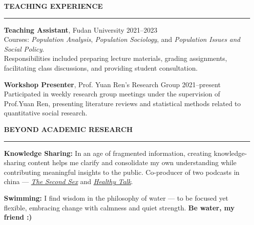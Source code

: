 \documentclass{resume} %
\renewenvironment{rSection}[1]{
\sectionskip
\textcolor{CarnegieMellonRed}{\MakeUppercase{#1}} %
\sectionlineskip
\hrule %
\begin{list}{}{
\setlength{\leftmargin}{1.5em} %
}
\item[]
}{
\end{list}
}
\begin{document}
\begin{rSection}{\textbf{Teaching Experience}}

\textbf{Teaching Assistant}, Fudan University \hfill 2021–2023 \\
Courses: \textit{Population Analysis}, \textit{Population Sociology}, and \textit{Population Issues and Social Policy}. \\
\textcolor{RoyalBlueCustom}{Responsibilities included preparing lecture materials, grading assignments, facilitating class discussions, and providing student consultation.}

\textbf{Workshop Presenter}, Prof. Yuan Ren’s Research Group \hfill 2021–present \\
\textcolor{RoyalBlueCustom}{Participated in weekly research group meetings under the supervision of Prof.Yuan Ren, presenting literature reviews and statistical methods related to quantitative social research.}
\end{rSection}



\begin{rSection}{\textbf{Beyond Academic Research}}

\textbf{Knowledge Sharing:}  
In an age of fragmented information, creating knowledge-sharing content helps me clarify and consolidate my own understanding while contributing meaningful insights to the public.  
Co-producer of two podcasts in china — \href{}{\textit{The Second Sex}} and \href{}{\textit{Healthy Talk}}.

\textbf{Swimming:}  
I find wisdom in the philosophy of water — to be focused yet flexible, embracing change with calmness and quiet strength.
\textcolor{RoyalBlueCustom}{\textbf{Be water, my friend :)}}
\end{rSection}
\end{document}
